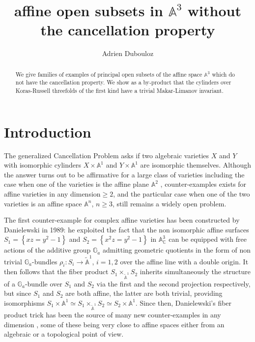 \documentclass[10pt,oneside,english]{amsart}
\numberwithin{equation}{section}
\numberwithin{figure}{section}
\theoremstyle{plain}
\theoremstyle{remark}
\theoremstyle{plain}
\theoremstyle{plain}
\theoremstyle{definition}
\begin{document}
\title{affine open subsets in $\mathbb{A}^{3}$ without the cancellation
property }


\author{Adrien Dubouloz}


\address{Cnrs, Institut de Math\'ematiques de Bourgogne, Universit\'e de
Bourgogne, 9 avenue Alain Savary - BP 47870, 21078 Dijon cedex, France}






\begin{abstract}
We give families of examples of principal open subsets of the affine
space $\mathbb{A}^{3}$ which do not have the cancellation property.
We show as a by-product that the cylinders over Koras-Russell threefolds
of the first kind have a trivial Makar-Limanov invariant. 
\end{abstract}
\maketitle

\section*{Introduction }

The generalized Cancellation Problem asks if two algebraic varieties
$X$ and $Y$ with isomorphic cylinders $X\times\mathbb{A}^{1}$ and
$Y\times\mathbb{A}^{1}$ are isomorphic themselves. Although the answer
turns out to be affirmative for a large class of varieties including
the case when one of the varieties is the affine plane $\mathbb{A}^{2}$
\cite{Iitaka1977a,Miyanishi1980}, counter-examples exists for affine
varieties in any dimension$\geq2$, and the particular case when one
of the two varieties is an affine space $\mathbb{A}^{n}$, $n\geq3$,
still remains a widely open problem. 

The first counter-example for complex affine varieties has been constructed
by Danielewski \cite{Danielewski89} in 1989: he exploited the fact
that the non isomorphic affine surfaces $S_{1}=\left\{ xz=y^{2}-1\right\} $
and $S_{2}=\left\{ x^{2}z=y^{2}-1\right\} $ in $\mathbb{A}_{\mathbb{C}}^{3}$
can be equipped with free actions of the additive group $\mathbb{G}_{a}$
admitting geometric quotients in the form of non trivial $\mathbb{G}_{a}$-bundles
$\rho_{i}:S_{i}\rightarrow\tilde{\mathbb{A}}^{1}$, $i=1,2$ over
the affine line with a double origin. It then follows that the fiber
product $S_{1}\times_{\tilde{\mathbb{A}}^{1}}S_{2}$ inherits simultaneously
the structure of a $\mathbb{G}_{a}$-bundle over $S_{1}$ and $S_{2}$
via the first and the second projection respectively, but since $S_{1}$
and $S_{2}$ are both affine, the latter are both trivial, providing
isomorphisms $S_{1}\times\mathbb{A}^{1}\simeq S_{1}\times_{\tilde{\mathbb{A}}^{1}}S_{2}\simeq S_{2}\times\mathbb{A}^{1}$.
Since then, Danielewski's fiber product trick has been the source
of many new counter-examples in any dimension \cite{Fieseler1994,Dubouloz2007,Finston2008,Dubouloz2011},
some of these being very close to affine spaces either from an algebraic
or a topological point of view. 
\end{document}
